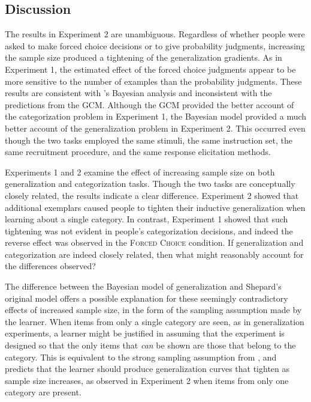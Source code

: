 \documentclass[doc,apacite]{apa6}
\newcommand{\possessivecite}[1]{\citeauthor{#1}'s \citeyear{#1}}
\begin{document}
\subsection{Discussion}

The results in Experiment 2 are unambiguous. Regardless of whether people were asked to make forced choice decisions or to give probability judgments, increasing the sample size produced a tightening of the generalization gradients. As in Experiment 1, the estimated effect of the forced choice judgments appear to be more sensitive to the number of examples than the probability judgments. These results are consistent with \possessivecite{tenenbaum2001generalization} Bayesian analysis and inconsistent with the predictions from the GCM. Although the GCM provided the better account of the categorization problem in Experiment 1, the Bayesian model provided a much better account of the generalization problem in Experiment 2. This occurred even though the two tasks employed the same stimuli, the same instruction set, the same recruitment procedure, and the same response elicitation methods. 

Experiments 1 and 2 examine the effect of increasing sample size on both generalization and categorization tasks. 
Though the two tasks are conceptually closely related, the results indicate a clear difference.
Experiment 2 showed that additional exemplars caused people to tighten their inductive generalization when learning about a single category.
In contrast, Experiment 1 showed that such tightening was not evident in  people's categorization decisions, and indeed the reverse effect was observed in the {\textsc{Forced Choice}} condition. 
If generalization and categorization are indeed closely related, then what might reasonably account for the differences observed? 

The difference between the Bayesian model of generalization and Shepard's original model offers a possible explanation for these seemingly contradictory effects of increased sample size, in the form of the sampling assumption made by the learner. 
When items from only a single category are seen, as in generalization experiments, a learner might be justified in assuming that the experiment is designed so that the only items that \textit{can} be shown are those that belong to the category. 
This is equivalent to the strong sampling assumption from , and predicts that the learner should produce generalization curves that tighten as sample size increases, as observed in Experiment 2 when items from only one category are present.
\end{document}
